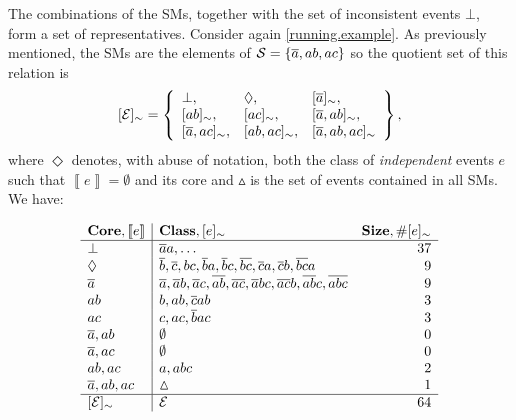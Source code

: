 \documentclass[adraft,copyright,creativecommons]{eptcs}
\newcommand{\co}[1]{\ensuremath{\overline{#1}}}
\newcommand{\fml}[1]{\ensuremath{{\cal #1}}}
\newcommand{\stablecore}[1]{\ensuremath{\left\llbracket #1 \right\rrbracket}}
\newcommand{\class}[1]{\ensuremath{[{#1}]_{\sim}}}
\newcommand{\inconsistent}{\bot}
\newcommand{\emptyevent}{\ensuremath{\vartriangle}}
\newcommand{\indepclass}{\ensuremath{\Diamond}}
\newcounter{remark}
\newcommand{\note}[1]{
    \stepcounter{remark}%
    {\!\!\color{red}/}\footnotemark[\arabic{remark}]\!\!%
    \footnotetext[\arabic{remark}]{{\color{red}/}#1}
}
\begin{document}
The combinations of the \aclp{SM}, together with the set of inconsistent events $\inconsistent$, form a set of representatives. Consider again \cref{running.example}. As previously mentioned, the \aclp{SM} are the elements of $\fml{S} = \set{\co{a}, ab, ac}$ so the quotient set of this relation is
\begin{equation}
    \class{\fml{E}} = \set{
        \begin{array}{lll}
            \inconsistent, &
            \indepclass, &
            \class{\co{a}}, \\
            \class{ab}, &
            \class{ac}, &
            \class{\co{a}, ab}, \\
            \class{\co{a}, ac}, &
            \class{ab, ac}, &
            \class{\co{a}, ab, ac}            
        \end{array}
    },
\end{equation}
where $\indepclass$ denotes, with abuse of notation, both the class of \emph{independent} events $e$ such that $\stablecore{e} = \emptyset$ and its core and $\emptyevent$ is the set of events contained in all \acp{SM}. We have:

\begin{equation*}
    \begin{array}{l|lr}
        \text{\textbf{Core}}, \stablecore{e}
         & \text{\textbf{Class}}, \class{e}
         & \text{\textbf{Size}}, \# \class{e}                                                 \\
        \hline
        \inconsistent
         & \co{a}a, \ldots
         & 37
        \\
        \indepclass
         & \co{b}, \co{c}, bc, \co{b}a, \co{b}c, \co{bc}, \co{c}a, \co{c}b, \co{bc}a
         & 9
        \\
        \co{a}
         & \co{a}, \co{a}b, \co{a}c, \co{ab}, \co{ac}, \co{a}bc, \co{ac}b, \co{ab}c, \co{abc}
         & 9
        \\
        ab
         & b, ab, \co{c}ab
         & 3
        \\
        ac
         & c, ac, \co{b}ac
         & 3
        \\
        \co{a}, ab
         & \emptyset
         & 0
        \\
        \co{a}, ac
         & \emptyset
         & 0
        \\
        ab, ac
         & a, abc
         & 2
        \\
        \co{a}, ab, ac
         & \emptyevent
         & 1
        \\
        \hline
        \class{\fml{E}}
         & \fml{E}
         & 64
    \end{array}
\end{equation*}
\end{document}
